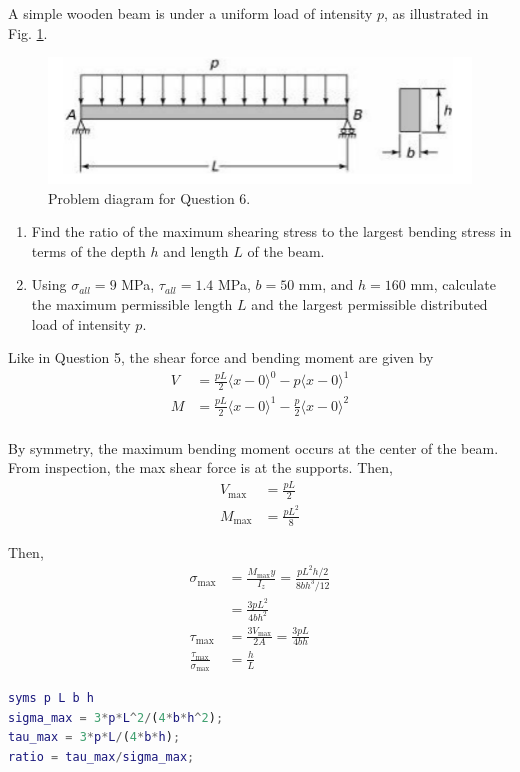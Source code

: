 \section{}
A simple wooden beam is under a uniform load of intensity $p$, as illustrated in Fig. \ref{fig:Q6ProblemDiagram}.
\begin{figure}[h]
    \centering
    \includegraphics[width=0.35\linewidth]{Questions/Figures/Q6ProblemDiagram.png}
    \caption{Problem diagram for Question 6.}
    \label{fig:Q6ProblemDiagram}
\end{figure}
\begin{enumerate}[label=(\alph*)]
    \item Find the ratio of the maximum shearing stress to the largest bending stress in terms of the
    depth $h$ and length $L$ of the beam.
    \item Using $\sigma_{all} = 9$ MPa, $\tau_{all} = 1.4$ MPa, $b = 50$ mm, and $h = 160$ mm, calculate the maximum
    permissible length $L$ and the largest permissible distributed load of intensity $p$.
\end{enumerate}

Like in Question 5, the shear force and bending moment are given by
\begin{align*}
    V &= \frac{pL}{2} \langle x - 0 \rangle^{0} - p \langle x - 0 \rangle^{1} \\
    M & = \frac{pL}{2} \langle x - 0 \rangle^{1} - \frac{p}{2} \langle x - 0 \rangle^{2} \\
\end{align*}

By symmetry, the maximum bending moment occurs at the center of the beam. From inspection, the max shear force is at the supports. Then,
\begin{align*}
    V_{\max} &= \frac{pL}{2} \\
    M_{\max} &= \frac{pL^2}{8}
\end{align*}

Then,
\begin{align*}
    \sigma_{\max} &= \frac{M_{\max} y}{I_z} = \frac{pL^2 h/2}{8 bh^3/12} \\
    &= \frac{3pL^2}{4bh^2} \\
    \tau_{\max} &= \frac{3V_{\max}}{2A} = \frac{3pL}{4bh} \\
    \frac{\tau_{\max}}{\sigma_{\max}} &= \boxed{\frac{h}{L}}    
\end{align*}
\begin{lstlisting}[language=Matlab]
syms p L b h
sigma_max = 3*p*L^2/(4*b*h^2);
tau_max = 3*p*L/(4*b*h);
ratio = tau_max/sigma_max;
\end{lstlisting}

